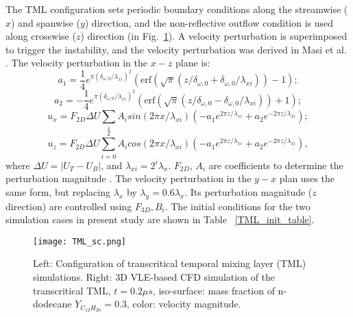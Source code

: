 The TML configuration sets periodic boundary conditions along the streamwise ($x$) and spanwise ($y$) direction, and the non-reflective outflow condition is used along crosswise ($z$) direction (in Fig.~\ref{TML_GEO}). A velocity perturbation is superimposed to trigger the instability, and the velocity perturbation was derived in Masi et al. \cite{masi2013multi}. The velocity perturbation in the $x-z$ plane is:
$$ a_1 = \frac{1}{4} e^{\pi (\delta_{\omega,0}/ \lambda_{xi})^2}(\textrm{erf}(\sqrt{\pi}(z/\delta_{\omega,0}+ \delta_{\omega,0}/\lambda_{xi}))-1);$$
$$ a_2 = -\frac{1}{4} e^{\pi (\delta_{\omega,0}/ \lambda_{xi})^2}(\textrm{erf}(\sqrt{\pi}(z/\delta_{\omega,0}- \delta_{\omega,0}/\lambda_{xi}))+1);$$
$$u_x = F_{2D} \Delta U \sum_i A_i sin(2\pi x/ \lambda_{xi}) (-a_1 e^{2\pi z / \lambda_{xi}}+a_2 e^{- 2\pi z / \lambda_{xi}});$$
$$u_z= F_{2D} \Delta U \sum_{i=0}^{2} A_i cos(2\pi x/ \lambda_{xi}) (-a_1 e^{2\pi z / \lambda_{xi}}+a_2 e^{- 2\pi z / \lambda_{xi}}),$$
where $\Delta U = |U_T-U_B|$, and $\lambda_{xi}=2^i\lambda_x$. $F_{2D}$, $A_i$ are coefficients to determine the perturbation magnitude \cite{masi2013multi}. The velocity perturbation in the $y-x$ plan uses the same form, but replacing $\lambda_x$ by $\lambda_y = 0.6 \lambda_x$. Its perturbation magnitude ($z$ direction) are controlled using $F_{3D}, B_i$. The initial conditions for the two simulation cases in present study are shown in Table ~\ref{TML_init_table}.

\begin{figure}[htbp]
	\centering

	\texttt{[image: TML\_sc.png]}
	\hspace{.2in}
	\caption{Left: Configuration of transcritical temporal mixing layer (TML) simulations. Right: 3D VLE-based CFD simulation of the transcritical TML, $t=0.2\mu s$, iso-surface: mass fraction of n-dodecane $Y_{C_{12}H_{26}} = 0.3$, color: velocity magnitude.}
	\label{TML_GEO}
\end{figure}


